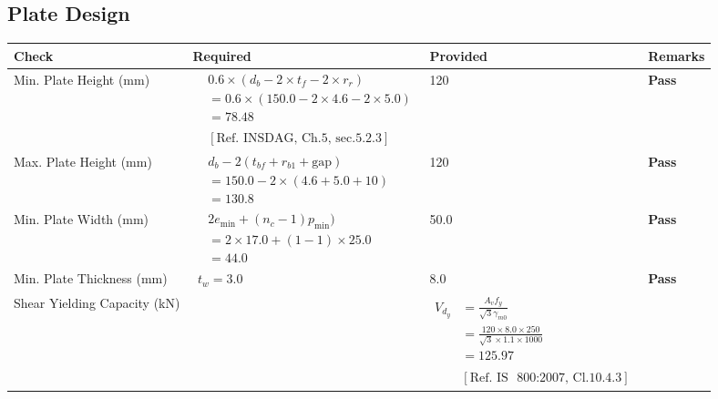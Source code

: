 \documentclass{article}%
\begin{document}
\subsection{Plate Design}%
\label{subsec:PlateDesign}%
\renewcommand{\arraystretch}{1.2}%
\begin{longtable}{|p{3.5cm}|p{5cm}|p{6cm}|p{1.5cm}|}%
\hline%
\rowcolor{OsdagGreen}%
Check&Required&Provided&Remarks\\%
\hline%
\endhead%
\hline%
Min. Plate Height (mm)&$\begin{aligned} & 0.6 \times (d_b - 2 \times t_f - 2 \times r_r)\\ &= 0.6 \times (150.0- 2 \times4.6- 2 \times5.0)\\ &=78.48\\ \\ & [\text{Ref. INSDAG, Ch.5, sec.5.2.3}] \end{aligned}$&120&\textcolor{OsdagGreen}{ 
\textbf{Pass}
}\\%
\hline%
Max. Plate Height (mm)&$\begin{aligned} &d_b - 2 (t_{bf} + r_{b1} + \text{gap})\\ &=150.0- 2\times (4.6+5.0+ 10)\\ &=130.8\end{aligned}$&120&\textcolor{OsdagGreen}{ 
\textbf{Pass}
}\\%
\hline%
Min. Plate Width (mm)&$\begin{aligned} &2e_{\text{min}} + (n_c-1) p_{\text{min}})\\ &=2\times17.0+(1-1)  \times  25.0\\ &=44.0\end{aligned}$&50.0&\textcolor{OsdagGreen}{ 
\textbf{Pass}
}\\%
\hline%
Min. Plate Thickness (mm)&$\begin{aligned} t_w=3.0\end{aligned}$&8.0&\textcolor{OsdagGreen}{ 
\textbf{Pass}
}\\%
\hline%
Shear Yielding Capacity (kN)&&$\begin{aligned} V_{d_y} &= \frac{A_vf_y}{\sqrt{3}\gamma_{m0}}\\ &=\frac{120\times8.0\times250}{\sqrt{3} \times1.1 \times 1000}\\ &=125.97 \\ \\ & [\text{Ref. IS ~800:2007,~Cl.10.4.3}] \end{aligned}$&\textcolor{OsdagGreen}{ 
\textbf{}
}\\%

\end{longtable}
\end{document}
